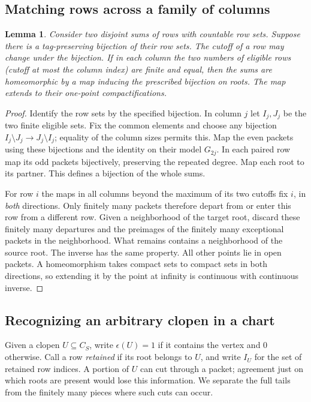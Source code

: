 \documentclass[11pt,letterpaper]{article}
\newtheorem{lemma}[theorem]{Lemma}
\theoremstyle{definition}\newtheorem{definition}[theorem]{Definition}
\begin{document}
\subsection{Matching rows across a family of columns}
\begin{lemma}\label{lem:match}
Consider two disjoint sums of rows with countable row sets. Suppose there
is a tag-preserving bijection of their row sets. The cutoff of a row may
change under the bijection. If in each column the two numbers of eligible
rows (cutoff at most the column index) are finite and equal, then the sums
are homeomorphic by a map inducing the prescribed bijection on roots.
The map extends to their one-point compactifications.
\end{lemma}
\begin{proof}
Identify the row sets by the specified bijection. In column \(j\) let
\(I_j,J_j\) be the two finite eligible sets. Fix the common elements and
choose any bijection \(I_j\setminus J_j\to J_j\setminus I_j\); equality
of the column sizes permits this. Map the even packets using these
bijections and the identity on their model \(G_{2j}\). In each paired
row map its odd packets bijectively, preserving the repeated degree.
Map each root to its partner. This defines a bijection of the whole sums.

For row \(i\) the maps in all columns beyond the maximum of its two
cutoffs fix \(i\), in \emph{both} directions. Only finitely many packets
therefore depart from or enter this row from a different row. Given a
neighborhood of the target root, discard these finitely many departures
and the preimages of the finitely many exceptional packets in the
neighborhood. What remains contains a neighborhood of the source root.
The inverse has the same property. All other points lie in open packets.
A homeomorphism takes compact sets to compact sets in both directions,
so extending it by the point at infinity is continuous with continuous
inverse.
\end{proof}

\subsection{Recognizing an arbitrary clopen in a chart}
Given a clopen \(U\subseteq C_S\), write \(\epsilon(U)=1\) if it contains
the vertex and \(0\) otherwise. Call a row \emph{retained} if its root
belongs to \(U\), and write \(I_U\) for the set of retained row indices.
A portion of \(U\) can cut through a packet; agreement just on which roots
are present would lose this information. We separate the full tails from
the finitely many pieces where such cuts can occur.
\end{document}
